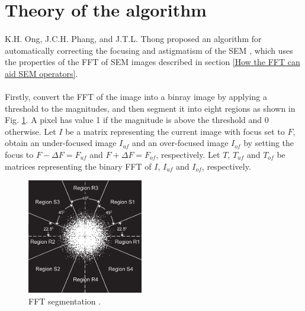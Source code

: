 \documentclass[12pt, twocolumn]{report}
\begin{document}
\section{Theory of the algorithm}
\paragraph{}
K.H. Ong, J.C.H. Phang, and J.T.L. Thong proposed an algorithm for automatically correcting the focusing and astigmatism of the SEM \cite{SEM correction algorithm}, which uses the properties of the FFT of SEM images described in section \ref{How the FFT can aid SEM operators}.

\paragraph{}
Firstly, convert the FFT of the image into a binray image by applying a threshold to the magnitudes, and then segment it into eight regions as shown in Fig. \ref{Correction algorithm FFT segmentation}. A pixel has value 1 if the magnitude is above the threshold and 0 otherwise. Let $I$ be a matrix representing the current image with focus set to $F$, obtain an under-focused image $I_{uf}$ and an over-focused image $I_{of}$ by setting the focus to $F-\Delta F=F_{uf}$ and $F+\Delta F=F_{of}$, respectively. Let $T$, $T_{uf}$ and $T_{of}$ be matrices representing the binary FFT of $I$, $I_{uf}$ and $I_{of}$, respectively.

\begin{figure}[htbp]
    \centering
    \includegraphics[width=0.45\textwidth]{Figures/Correction algorithm FFT segmentation.jpg}
    \caption{FFT segmentation \cite{SEM correction algorithm}.}
    \label{Correction algorithm FFT segmentation}
\end{figure}
\end{document}
